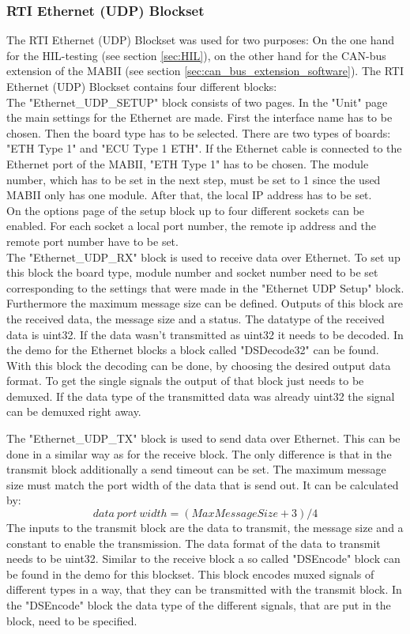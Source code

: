 \documentclass[ExampleMasters.tex]{subfiles}
\begin{document}
\subsubsection{RTI Ethernet (UDP) Blockset}
The RTI Ethernet (UDP) Blockset was used for two purposes: On the one hand for the HIL-testing (see section \ref{sec:HIL}), on the other hand for the CAN-bus extension of the MABII (see section \ref{sec:can_bus_extension_software}). The RTI Ethernet (UDP) Blockset contains four different blocks:\\
The "Ethernet\_UDP\_SETUP" block consists of two pages. In the "Unit" page the main settings for the Ethernet are made. First the interface name has to be chosen. Then the board type has to be selected. There are two types of boards: "ETH Type 1" and "ECU Type 1 ETH". If the Ethernet cable is connected to the Ethernet port of the MABII, "ETH Type 1" has to be chosen. The module number, which has to be set in the next step, must be set to 1 since the used MABII only has one module.
After that, the local IP address has to be set.\\
On the options page of the setup block up to four different sockets can be enabled. For each socket a local port number, the remote ip address and the remote port number have to be set.\\
 
The "Ethernet\_UDP\_RX" block is used to receive data over Ethernet. To set up this block the board type, module number and socket number need to be set corresponding to the settings that were made in the "Ethernet UDP Setup" block. Furthermore the maximum message size can be defined. Outputs of this block are the received data, the message size and a status. The datatype of the received data is uint32. If the data wasn't transmitted as uint32 it needs to be decoded. In the demo for the Ethernet blocks a block called "DSDecode32" can be found. With this block the decoding can be done, by choosing the desired output data format. To get the single signals the output of that block just needs to be demuxed. If the data type of the transmitted data was already uint32 the signal can be demuxed right away.

The "Ethernet\_UDP\_TX" block is used to send data over Ethernet. This can be done in a similar way as for the receive block. The only difference is that in the transmit block additionally a send timeout can be set. The maximum message size must match the port width of the data that is send out. It can be calculated by:
\begin{equation}
data\ port\ width=(MaxMessageSize + 3) / 4
\end{equation}
The inputs to the transmit block are the data to transmit, the message size and a constant to enable the transmission. The data format of the data to transmit needs to be uint32. Similar to the receive block a so called "DSEncode" block can be found in the demo for this blockset. This block encodes muxed signals of different types in a way, that they can be transmitted with the transmit block. In the "DSEncode" block the data type of the different signals, that are put in the block, need to be specified.
\end{document}
